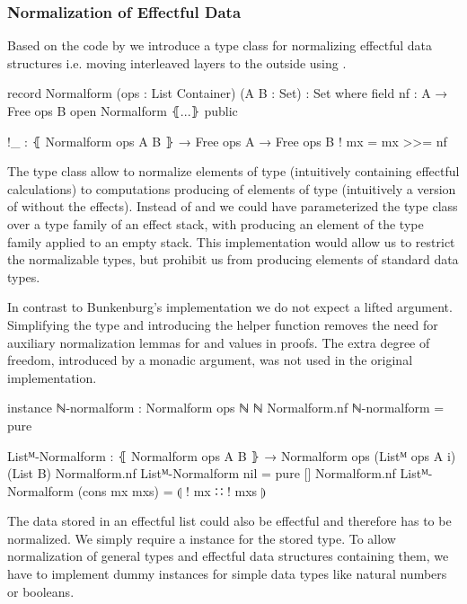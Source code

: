 \subsubsection{Normalization of Effectful Data}

Based on the code by \textcite{bunkenburg2019modeling} we introduce a type
class for normalizing effectful data structures i.e. moving interleaved
 layers to the outside using \AgdaFunction{>>=}.

\begin{code}
record Normalform (ops : List Container) (A B : Set) : Set where
  field
    nf : A → Free ops B
open Normalform ⦃...⦄ public

!_ : ⦃ Normalform ops A B ⦄ → Free ops A → Free ops B
! mx = mx >>= nf
\end{code}
The type class allow to normalize elements of type  (intuitively
containing effectful calculations) to computations producing of elements of type
 (intuitively a version of  without the effects).
Instead of  and  we could have parameterized the
type class over a type family of an effect stack, with 
producing an element of the type family applied to an empty stack.
This implementation would allow us to restrict the normalizable types, but
prohibit us from producing elements of standard data types.

In contrast to Bunkenburg's implementation we do not expect a lifted argument.
Simplifying the type and introducing the helper function \AgdaFunction{!\_}
removes the need for auxiliary normalization lemmas for
 and  values in
proofs.
The extra degree of freedom, introduced by a monadic argument, was not used in
the original implementation.

\begin{code}
instance
  ℕ-normalform : Normalform ops ℕ ℕ
  Normalform.nf ℕ-normalform = pure

  Listᴹ-Normalform : ⦃ Normalform ops A B ⦄ →
    Normalform ops (Listᴹ ops A {i}) (List B)
  Normalform.nf Listᴹ-Normalform nil            = pure []
  Normalform.nf Listᴹ-Normalform (cons mx mxs)  = ⦇ ! mx ∷ ! mxs ⦈
\end{code}
The data stored in an effectful list could also be effectful and therefore has
to be normalized.
We simply require a  instance for the stored type.
To allow normalization of general types and effectful data structures containing
them, we have to implement dummy instances for simple data types like natural
numbers or booleans.

